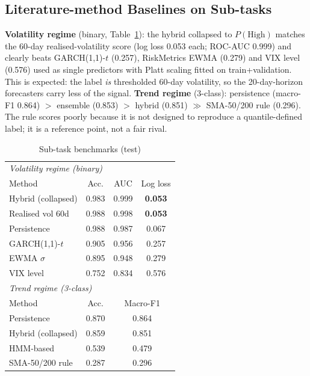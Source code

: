 \documentclass[conference]{IEEEtran}
\newcommand{\best}[1]{\textbf{#1}}
\begin{document}
\subsection{Literature-method Baselines on Sub-tasks}
\textbf{Volatility regime} (binary, Table~\ref{tab:sub}): the hybrid collapsed to $P(\text{High})$ matches the 60-day realised-volatility score (log loss 0.053 each; ROC-AUC 0.999) and clearly beats GARCH(1,1)-$t$ (0.257), RiskMetrics EWMA (0.279) and VIX level (0.576) used as single predictors with Platt scaling fitted on train+validation. This is expected: the label \emph{is} thresholded 60-day volatility, so the 20-day-horizon forecasters carry less of the signal. \textbf{Trend regime} (3-class): persistence (macro-F1 0.864) $>$ ensemble (0.853) $>$ hybrid (0.851) $\gg$ SMA-50/200 rule (0.296). The rule scores poorly because it is not designed to reproduce a quantile-defined label; it is a reference point, not a fair rival.

\begin{table}[t]\caption{Sub-task benchmarks (test)}\label{tab:sub}\centering\small
\begin{tabular}{lccc}\toprule \multicolumn{4}{l}{\emph{Volatility regime (binary)}}\\ Method & Acc. & AUC & Log loss\\\midrule
Hybrid (collapsed) & 0.983 & 0.999 & \best{0.053}\\ Realised vol 60d & 0.988 & 0.998 & \best{0.053}\\ Persistence & 0.988 & 0.987 & 0.067\\ GARCH(1,1)-$t$ & 0.905 & 0.956 & 0.257\\ EWMA $\sigma$ & 0.895 & 0.948 & 0.279\\ VIX level & 0.752 & 0.834 & 0.576\\\midrule
\multicolumn{4}{l}{\emph{Trend regime (3-class)}}\\ Method & Acc. & \multicolumn{2}{c}{Macro-F1}\\\midrule
Persistence & 0.870 & \multicolumn{2}{c}{0.864}\\ Hybrid (collapsed) & 0.859 & \multicolumn{2}{c}{0.851}\\ HMM-based & 0.539 & \multicolumn{2}{c}{0.479}\\ SMA-50/200 rule & 0.287 & \multicolumn{2}{c}{0.296}\\\bottomrule\end{tabular}\end{table}
\end{document}
